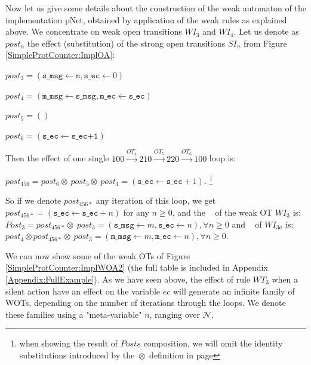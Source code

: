 \documentclass{lmcs}
\newcommand{\TODO}[1]{\textcolor{red}{\textbf{[TODO:#1]}}}
\newcommand{\shortotimes}{\!\otimes\!}
\begin{document}
Now let us give some details about the construction of the weak automaton of the implementation pNet, obtained by application of the weak rules as explained above. We concentrate on weak open transitions $WI_3$ and $WI_4$. Let us denote as $post_n$ the effect (substitution) of the strong open transitions $SI_n$ from Figure \ref{SimpleProtCounter:ImplOA}:
\smallskip

$post_3 = (\texttt{s\_msg}\gets \texttt{m}, \texttt{s\_ec}\gets 0)$

$post_4 = (\texttt{m\_msg}\gets \texttt{s\_msg}, \texttt{m\_ec}\gets \texttt{s\_ec})$

$post_5 = ()$

$post_6 = (\texttt{s\_ec}\gets \texttt{s\_ec+1})$

\medskip

Then the effect of one single $100 \xrightarrow{OT_4} 210 \xrightarrow{OT_5} 220 \xrightarrow{OT_6} 100$ loop is:
\smallskip

$post_{456} = post_6 \shortotimes\ post_5 \shortotimes\ post_4
= (\texttt{s\_ec}\gets \texttt{s\_ec}+1)$.
\footnote{when showing  the result of $Posts$ composition, we will omit the identity substitutions introduced by the $\shortotimes$ definition in page \pageref{def:substitutions}}
\medskip

So if we denote ${post_{456*}}$ any iteration of this loop, we get ${post_{456*}} = (\texttt{s\_ec}\gets \texttt{s\_ec}+n)$ for any $n\ge 0$, and the \Post~ of the weak OT  $WI_{3}$ is:\\
 $Post_3 = post_{456*}\shortotimes\ post_3 = (\texttt{s\_msg}\gets m, \texttt{s\_ec}\gets n), \forall n\ge 0$ and \Post~ of  $WI_{3a}$  is:\\ $post_4\shortotimes {post_{456*}}\shortotimes\ post_3 = (\texttt{m\_msg}\gets m, \texttt{m\_ec}\gets n), \forall n\ge 0$.
\medskip

We can now show some of the weak OTs of Figure \ref{SimpleProtCounter:ImplWOA2} (the full table is included in Appendix \ref{Appendix:FullExample}).
As we have seen above, the effect of rule $WT_3$ when a silent action have an effect on the variable $ec$ will generate an infinite family of WOTs, depending on the number of iterations through the loops. We denote these families using a "meta-variable" $n$, ranging over $\mathcal{N}$.
\smallskip
\end{document}
